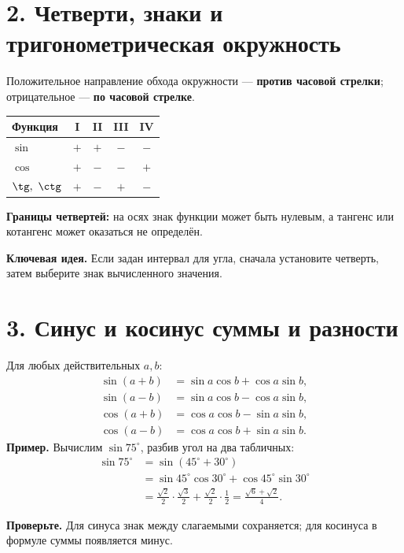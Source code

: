 \documentclass[a4paper,12pt]{article}
\newcommand{\keyidea}[1]{\par\smallskip\noindent\textcolor{darkaccent}{\textbf{Ключевая идея.}} #1\par\smallskip}
\newcommand{\alertline}[1]{\par\smallskip\noindent\textcolor{darkaccent}{\textbf{Проверьте.}} #1\par\smallskip}
\newcommand{\sectionheading}[1]{\section*{\textcolor{darkaccent}{#1}}}
\begin{document}
\sectionheading{2. Четверти, знаки и тригонометрическая окружность}
Положительное направление обхода окружности --- \textbf{против часовой стрелки};
отрицательное --- \textbf{по часовой стрелке}.
\begin{center}
\begin{minipage}[c]{0.39\linewidth}
\centering
{}
\end{minipage}\hfill
\begin{minipage}[c]{0.57\linewidth}
\centering
\renewcommand{\arraystretch}{1.24}
\begin{tabular}{@{}lcccc@{}}
\toprule
Функция & I & II & III & IV\\
\midrule
$\sin$ & $+$ & $+$ & $-$ & $-$\\
$\cos$ & $+$ & $-$ & $-$ & $+$\\
$\tg,\ \ctg$ & $+$ & $-$ & $+$ & $-$\\
\bottomrule
\end{tabular}
\end{minipage}
\end{center}
\textbf{Границы четвертей:} на осях знак функции может быть нулевым,
а тангенс или котангенс может оказаться не определён.
\keyidea{Если задан интервал для угла, сначала установите четверть, затем выберите знак вычисленного значения.}

\sectionheading{3. Синус и косинус суммы и разности}
Для любых действительных $a,b$:
\begin{align*}
\sin(a+b)&=\sin a\cos b+\cos a\sin b,\\
\sin(a-b)&=\sin a\cos b-\cos a\sin b,\\
\cos(a+b)&=\cos a\cos b-\sin a\sin b,\\
\cos(a-b)&=\cos a\cos b+\sin a\sin b.
\end{align*}
\textbf{Пример.} Вычислим $\sin75^\circ$, разбив угол на два табличных:
\begin{align*}
\sin75^\circ&=\sin(45^\circ+30^\circ)\\
&=\sin45^\circ\cos30^\circ+\cos45^\circ\sin30^\circ\\
&=\frac{\sqrt2}{2}\cdot\frac{\sqrt3}{2}+\frac{\sqrt2}{2}\cdot\frac12
=\frac{\sqrt6+\sqrt2}{4}.
\end{align*}
\alertline{Для синуса знак между слагаемыми сохраняется; для косинуса в формуле суммы появляется минус.}
\end{document}
